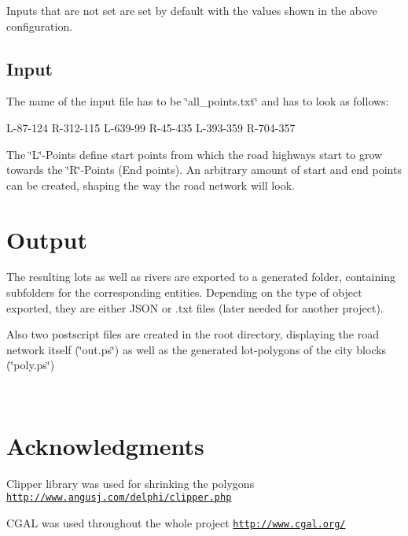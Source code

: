 Inputs that are not set are set by default with the values shown in the above configuration.\hypertarget{index_input_file}{}\subsection{Input}\label{index_input_file}
The name of the input file has to be \char`\"{}all\+\_\+points.\+txt\char`\"{} and has to look as follows\+:


\begin{DoxyCode}
L-87-124
R-312-115
L-639-99
R-45-435
L-393-359
R-704-357
\end{DoxyCode}


The \char`\"{}\+L\char`\"{}-\/\+Points define start points from which the road highways start to grow towards the \char`\"{}\+R\char`\"{}-\/\+Points (End points). An arbitrary amount of start and end points can be created, shaping the way the road network will look.\hypertarget{index_generated_output}{}\section{Output}\label{index_generated_output}
The resulting lots as well as rivers are exported to a generated folder, containing subfolders for the corresponding entities. Depending on the type of object exported, they are either J\+S\+ON or .txt files (later needed for another project).

Also two postscript files are created in the root directory, displaying the road network itself (\char`\"{}out.\+ps\char`\"{}) as well as the generated lot-\/polygons of the city blocks (\char`\"{}poly.\+ps\char`\"{})

~\newline
 \hypertarget{index_ack_sec}{}\section{Acknowledgments}\label{index_ack_sec}

\begin{DoxyItemize}
\item Clipper library was used for shrinking the polygons \href{http://www.angusj.com/delphi/clipper.php}{\tt http\+://www.\+angusj.\+com/delphi/clipper.\+php}
\item C\+G\+AL was used throughout the whole project \href{http://www.cgal.org/}{\tt http\+://www.\+cgal.\+org/} 
\end{DoxyItemize}
